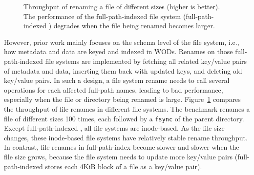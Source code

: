 \begin{figure}[t]
    \centering
    \caption[File renames can be slow in full-path-indexed file systems]{\label{fig:file_rename_intro}
        Throughput of renaming a file of different sizes (higher is better).
        The performance of the full-path-indexed file system
        (full-path-indexed \betrfsThree)
        degrades when the file being renamed becomes larger.}
\end{figure}

However, prior work mainly focuses on the schema level of the file system, i.e.,
how metadata and data are keyed and indexed in WODs.
Renames on those full-path-indexed file systems are implemented by fetching all
related key/value pairs of metadata and data,
inserting them back with updated keys, and deleting old key/value pairs.
In such a design, a file system rename needs to call several operations for each
affected full-path names, leading to bad performance,
especially when the file or directory being renamed is large.
Figure~\ref{fig:file_rename_intro} compares the throughput of file renames in
different file systems.
The benchmark renames a file of different sizes 100 times, each followed by a
\texttt{fsync} of the parent directory.
Except full-path-indexed \betrfsThree, all file systems are inode-based.
As the file size changes, these inode-based file systems have relatively
stable rename throughput.
In contrast, file renames in full-path-index \betrfsThree become slower and
slower when the file size grows,
because the file system needs to update more key/value pairs
(full-path-indexed \betrfsThree stores each 4KiB block of a file as
a key/value pair).

